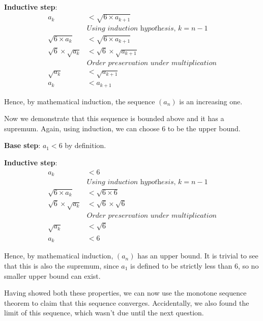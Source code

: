 \documentclass[11pt]{article}
\begin{document}
\textbf{Inductive step}:
\begin{equation*}
  \begin{aligned}
    a_k                        &< \sqrt{6 \times a_{k+1}} \\
                               &\textit{Using induction hypothesis, $k = n - 1$} \\
    \sqrt{6 \times a_k}        &< \sqrt{6 \times a_{k+1}} \\
    \sqrt{6} \times \sqrt{a_k} &< \sqrt{6} \times \sqrt{a_{k+1}} \\
                               &\textit{Order preservation under multiplication} \\
    \sqrt{a_k}                 &< \sqrt{a_{k+1}} \\
    a_k                 &< a_{k+1}
  \end{aligned}
\end{equation*}

Hence, by mathematical induction, the sequence $(a_n)$ is an increasing one.

Now we demonstrate that this sequence is bounded above and it has a supremum.
Again, using induction, we can choose 6 to be the upper bound.

\textbf{Base step}: $a_1 < 6$ by definition.

\textbf{Inductive step}:
\begin{equation*}
  \begin{aligned}
    a_k                 &< 6 \\
                        &\textit{Using induction hypothesis, $k = n - 1$} \\
    \sqrt{6 \times a_k} &< \sqrt{6 \times 6} \\
    \sqrt{6} \times \sqrt{a_k} &< \sqrt{6} \times \sqrt{6} \\
                        &\textit{Order preservation under multiplication} \\
    \sqrt{a_k}          &< \sqrt{6} \\
    a_k &< 6
  \end{aligned}
\end{equation*}

Hence, by mathematical induction, $(a_n)$ has an upper bound. It is trivial
to see that this is also the supremum, since $a_1$ is defined to be strictly
less than 6, so no smaller upper bound can exist.

Having showed both these properties, we can now use the monotone sequence
theorem to claim that this sequence converges.  Accidentally, we also found
the limit of this sequence, which wasn't due until the next question.
\end{document}
